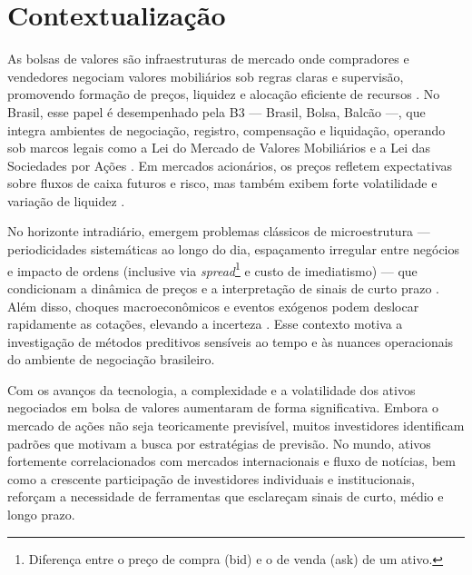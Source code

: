 \section{Contextualização}

As bolsas de valores são infraestruturas de mercado onde compradores e vendedores negociam valores mobiliários sob regras claras e supervisão, promovendo formação de preços, liquidez e alocação eficiente de recursos \cite{MishkinEakins2018, FabozziModigliani2009}. No Brasil, esse papel é desempenhado pela B3 — Brasil, Bolsa, Balcão —, que integra ambientes de negociação, registro, compensação e liquidação, operando sob marcos legais como a Lei do Mercado de Valores Mobiliários e a Lei das Sociedades por Ações \cite{b3_quem_somos,Lei6385,Lei6404}. Em mercados acionários, os preços refletem expectativas sobre fluxos de caixa futuros e risco, mas também exibem forte volatilidade e variação de liquidez \cite{BodieKaneMarcus2021}. 

No horizonte intradiário, emergem problemas clássicos de microestrutura — periodicidades sistemáticas ao longo do dia, espaçamento irregular entre negócios e impacto de ordens (inclusive via \textit{spread}\footnote{Diferença entre o preço de compra (bid) e o de venda (ask) de um ativo.} e custo de imediatismo) — que condicionam a dinâmica de preços e a interpretação de sinais de curto prazo \cite{andersen1997intraday,engle1998acd,hasbrouck2007empirical,amihud2002illiquidity,dufour2000time}. Além disso, choques macroeconômicos e eventos exógenos podem deslocar rapidamente as cotações, elevando a incerteza \cite{WorldBank2020}. Esse contexto motiva a investigação de métodos preditivos sensíveis ao tempo e às nuances operacionais do ambiente de negociação brasileiro.

Com os avanços da tecnologia, a complexidade e a volatilidade dos ativos negociados em bolsa de valores aumentaram de forma significativa. Embora o mercado de ações não seja teoricamente previsível, muitos investidores identificam padrões que motivam a busca por estratégias de previsão\cite{lo2017}. No mundo, ativos fortemente correlacionados com mercados internacionais e fluxo de notícias, bem como a crescente participação de investidores individuais e institucionais, reforçam a necessidade de ferramentas que esclareçam sinais de curto, médio e longo prazo.

